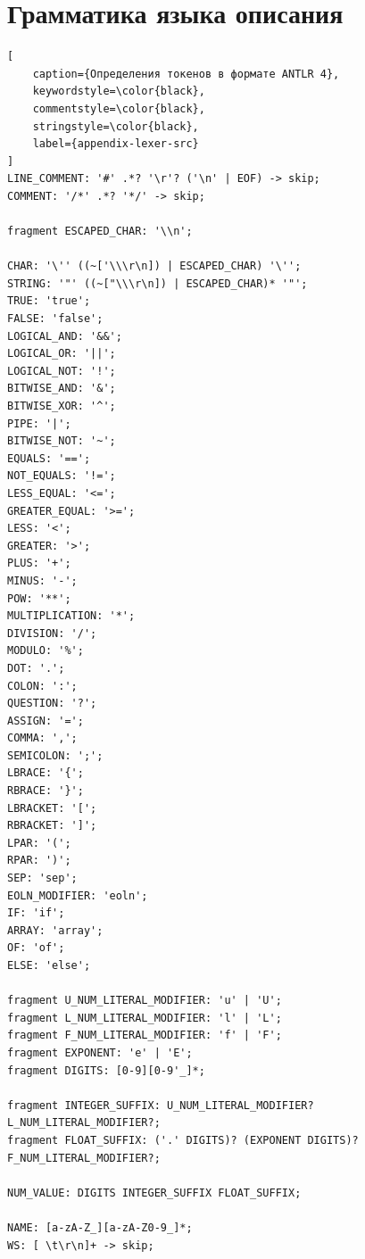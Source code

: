 \documentclass[times,specification,annotation]{style/itmo-student-thesis/itmo-student-thesis}
\begin{document}



\chapter{Грамматика языка описания}\label{appendix-antlr-grammar}

\begin{lstlisting}[
    caption={Определения токенов в формате ANTLR 4},
    keywordstyle=\color{black},
    commentstyle=\color{black},
    stringstyle=\color{black},
    label={appendix-lexer-src}
]
LINE_COMMENT: '#' .*? '\r'? ('\n' | EOF) -> skip;
COMMENT: '/*' .*? '*/' -> skip;

fragment ESCAPED_CHAR: '\\n';

CHAR: '\'' ((~['\\\r\n]) | ESCAPED_CHAR) '\'';
STRING: '"' ((~["\\\r\n]) | ESCAPED_CHAR)* '"';
TRUE: 'true';
FALSE: 'false';
LOGICAL_AND: '&&';
LOGICAL_OR: '||';
LOGICAL_NOT: '!';
BITWISE_AND: '&';
BITWISE_XOR: '^';
PIPE: '|';
BITWISE_NOT: '~';
EQUALS: '==';
NOT_EQUALS: '!=';
LESS_EQUAL: '<=';
GREATER_EQUAL: '>=';
LESS: '<';
GREATER: '>';
PLUS: '+';
MINUS: '-';
POW: '**';
MULTIPLICATION: '*';
DIVISION: '/';
MODULO: '%';
DOT: '.';
COLON: ':';
QUESTION: '?';
ASSIGN: '=';
COMMA: ',';
SEMICOLON: ';';
LBRACE: '{';
RBRACE: '}';
LBRACKET: '[';
RBRACKET: ']';
LPAR: '(';
RPAR: ')';
SEP: 'sep';
EOLN_MODIFIER: 'eoln';
IF: 'if';
ARRAY: 'array';
OF: 'of';
ELSE: 'else';

fragment U_NUM_LITERAL_MODIFIER: 'u' | 'U';
fragment L_NUM_LITERAL_MODIFIER: 'l' | 'L';
fragment F_NUM_LITERAL_MODIFIER: 'f' | 'F';
fragment EXPONENT: 'e' | 'E';
fragment DIGITS: [0-9][0-9'_]*;

fragment INTEGER_SUFFIX: U_NUM_LITERAL_MODIFIER? L_NUM_LITERAL_MODIFIER?;
fragment FLOAT_SUFFIX: ('.' DIGITS)? (EXPONENT DIGITS)? F_NUM_LITERAL_MODIFIER?;

NUM_VALUE: DIGITS INTEGER_SUFFIX FLOAT_SUFFIX;

NAME: [a-zA-Z_][a-zA-Z0-9_]*;
WS: [ \t\r\n]+ -> skip;
\end{lstlisting}
\end{document}
